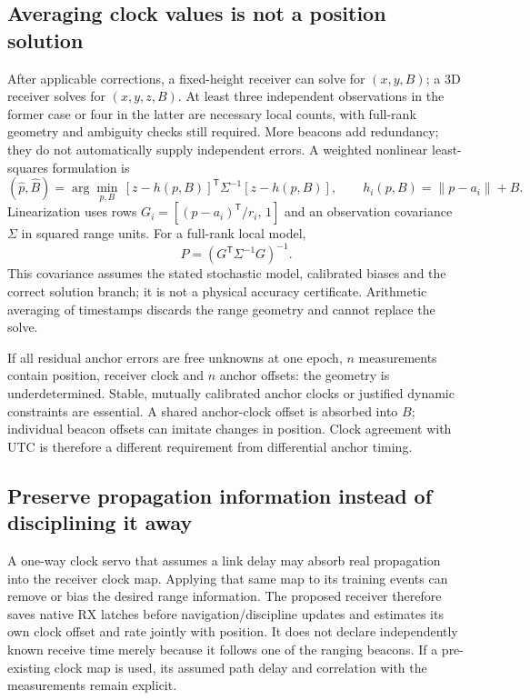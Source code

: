 \documentclass[11pt,letterpaper]{article}
\begin{document}
\subsection{Averaging clock values is not a position solution}
After applicable corrections, a fixed-height receiver can solve for $(x,y,B)$; a 3D receiver solves for $(x,y,z,B)$. At least three independent observations in the former case or four in the latter are necessary local counts, with full-rank geometry and ambiguity checks still required. More beacons add redundancy; they do not automatically supply independent errors. A weighted nonlinear least-squares formulation is
\begin{equation}
 (\hat p,\hat B)=\arg\min_{p,B}\,[z-h(p,B)]^{\mathsf T}\Sigma^{-1}[z-h(p,B)],
 \qquad h_i(p,B)=\|p-a_i\|+B.\label{eq:wls}
\end{equation}
Linearization uses rows $G_i=[(p-a_i)^{\mathsf T}/r_i,\,1]$ and an observation covariance $\Sigma$ in squared range units. For a full-rank local model,
\begin{equation}
 P=(G^{\mathsf T}\Sigma^{-1}G)^{-1}.\label{eq:cov}
\end{equation}
This covariance assumes the stated stochastic model, calibrated biases and the correct solution branch; it is not a physical accuracy certificate. Arithmetic averaging of timestamps discards the range geometry and cannot replace the solve.

If all residual anchor errors are free unknowns at one epoch, $n$ measurements contain position, receiver clock and $n$ anchor offsets: the geometry is underdetermined. Stable, mutually calibrated anchor clocks or justified dynamic constraints are essential. A shared anchor-clock offset is absorbed into $B$; individual beacon offsets can imitate changes in position. Clock agreement with UTC is therefore a different requirement from differential anchor timing.

\subsection{Preserve propagation information instead of disciplining it away}
A one-way clock servo that assumes a link delay may absorb real propagation into the receiver clock map. Applying that same map to its training events can remove or bias the desired range information. The proposed receiver therefore saves native RX latches before navigation/discipline updates and estimates its own clock offset and rate jointly with position. It does not declare independently known receive time merely because it follows one of the ranging beacons. If a pre-existing clock map is used, its assumed path delay and correlation with the measurements remain explicit.
\end{document}
